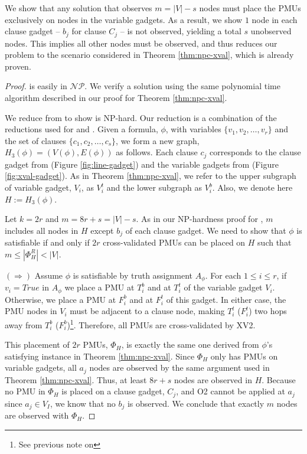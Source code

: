 We show that any solution that observes $m=|V|-s$ nodes must place the PMUs exclusively on nodes in the variable gadgets. As a result, we show
$1$ node in each clause gadget -- $b_j$ for clause $C_j$ -- is not observed, yielding a total $s$ unobserved nodes. This implies all other nodes must be
observed, and thus reduces our problem to the scenario considered in Theorem \ref{thm:npc-xval}, which is already proven.


\begin{proof}
\xvalpart is easily in $\mathcal{NP}$. We verify a \xvalpart solution using the same polynomial time algorithm described in our proof
for Theorem \ref{thm:npc-xval}. %

We reduce from \sat to show \xvalpart is NP-hard. Our reduction is a combination
of the reductions used for \maxinc and \xvals. Given a \sat formula, $\phi$,
with variables $\{v_1,v_2, \dots , v_r\}$ and the set of clauses $\{c_1,c_2,
\dots , c_s \}$, we form a new graph, $H_3(\phi) = (V(\phi),E(\phi))$  as follows. Each clause $c_j$
corresponds to the clause gadget from \maxinc (Figure \ref{fig:line-gadget})
and the variable gadgets from \xval (Figure \ref{fig:xval-gadget}).
As in Theorem \ref{thm:npc-xval}, we refer to the upper subgraph of variable gadget, $V_i$,
as $V_{i}^t$ and the lower subgraph as $V_{i}^b$.  Also, we denote here $H:= H_3(\phi)$.

Let $k = 2r$ and $m = 8r + s = |V| - s$. As in our NP-hardness proof for \maxincs, $m$ includes all nodes in $H$
except $b_j$ of each clause gadget. We need to show that $\phi$ is satisfiable if and only if
$2r$ cross-validated PMUs can be placed on $H$ such that $m \leq |\Phi^R_{H}| < |V|$.

$(\Rightarrow)$ Assume $\phi$ is satisfiable by truth assignment $A_{\phi}$.
For each $1\leq i\leq r$, if $v_i=True$ in $A_{\phi}$ we place a PMU at $T_i^b$
and at $T_i^t$ of the variable gadget $V_i$. Otherwise, we place a PMU at $F_i^b$
and at $F_i^t$ of this gadget. In either case, the PMU nodes in $V_i$ must be
adjacent to a clause node, making $T_i^t$ ($F_i^t$) two hops away from
$T_i^b$ ($F_i^b$)\footnote{See previous note on \xval}. Therefore, all PMUs are cross-validated by XV2.

This placement of $2r$ PMUs, $\Phi_H$, is exactly the same one derived from $\phi$'s satisfying instance in Theorem \ref{thm:npc-xval}.
Since $\Phi_H$ only has PMUs on variable gadgets, all $a_j$ nodes are observed by the same argument used in Theorem \ref{thm:npc-xval}.
Thus, at least $8r + s$ nodes are observed in $H$.
Because no PMU in $\Phi_H$ is placed on a clause gadget, $C_j$, and O2 cannot be applied at $a_j$ since $a_j \in V_I$, we know that no $b_j$ is observed.
We conclude that exactly $m$ nodes are observed with $\Phi_H$.


\end{proof}
